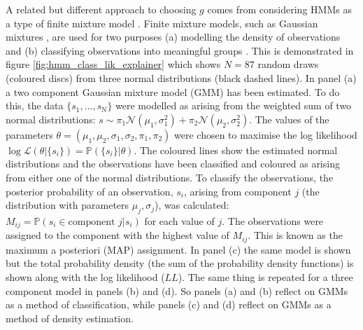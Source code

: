A related but different approach to choosing $g$ comes from  considering HMMs as a type of finite mixture model \cite{mclachlanFiniteMixtureModels2000}. Finite mixture models, such as Gaussian mixtures \cite{reynolds2009gaussian}, are used for two purposes (a) modelling the density of observations and (b) classifying observations into meaningful groups \cite{mclachlan1988mixture}. This is demonstrated in figure \ref{fig:hmm_class_lik_explainer} which shows $N = \num{87}$ random draws (coloured discs) from three normal distributions (black dashed lines). In panel (a) a two component Gaussian mixture model (GMM) has been estimated. To do this, the data $\{s_{1}, \ldots, s_{\mathrm{N}}\}$ were modelled as arising from the weighted sum of two normal distributions: $s \sim \pi_{1}\mathcal{N}\left(\mu_{1}, \sigma_{1}^{2}\right) +  \pi_{2}\mathcal{N}\left(\mu_{2}, \sigma_{2}^{2}\right)$. The values of the parameters $\theta = (\mu_{1}, \mu_{2}, \sigma_{1}, \sigma_{2}, \pi_{1}, \pi_{2})$ were chosen to maximise the log likelihood $\log{\mathcal{L}(\theta | \{s_{i}\})} = \mathbb{P}(\{s_{i}\}|\theta)$.  The coloured lines show the estimated normal distributions and the observations have been classified and coloured as arising from either one of the normal distributions. To classify the observations, the posterior probability of an  observation, $s_{i}$, arising from component $j$ (the distribution with parameters $\mu_{j}, \sigma_{j}$), was calculated: $M_{ij}=\mathbb{P}(s_{i} \in \text{component }j |s_{i})$ for each value of $j$. The observations were assigned to the component with the highest value of $M_{ij}$. This is known as the maximum a posteriori (MAP) assignment. In panel (c) the same model is shown but the total probability density (the sum of the probability density functions) is shown along with the log likelihood ($LL$). The same thing is repeated for a three component model in panels (b) and (d). So panels (a) and (b) reflect on GMMs as a method of classification, while panels (c) and (d) reflect on GMMs as a method of density estimation. 

